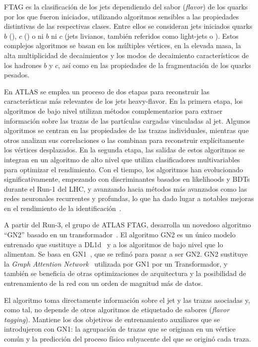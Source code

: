 \ac{FTAG} es la clasificación de los jets dependiendo del sabor (\textit{flavor}) de los quarks por los que fueron iniciados, utilizando algoritmos sensibles a las propiedades distintivas de las respectivas clases. Entre ellos se consideran jets iniciados quarks \(b\) (\bjets), \(c\) (\cjets) o ni \(b\) ni \(c\) (jets livianos, también referidos como light-jets o \ljets).
Estos complejos algoritmos se basan en los múltiples vértices, en la elevada masa, la alta multiplicidad de decaimientos y los modos de decaimiento característicos de los hadrones \(b\) y \(c\), así como en las propiedades de la fragmentación de los quarks pesados.


En \ac{ATLAS} se emplea un proceso de dos etapas para reconstruir las características más relevantes de los jets heavy-flavor. En la primera etapa, los algoritmos de bajo nivel utilizan métodos complementarios para extraer información sobre las trazas de las partículas cargadas vinculadas al jet. Algunos algoritmos se centran en las propiedades de las trazas individuales, mientras que otros analizan sus correlaciones o las combinan para reconstruir explícitamente los vértices desplazados. En la segunda etapa, las salidas de estos algoritmos se integran en un algoritmo de alto nivel que utiliza clasificadores multivariables para optimizar el rendimiento. Con el tiempo, los algoritmos han evolucionado significativamente, empezando con discriminantes basados en likelihoods y \acp{BDT} durante el Run-1 del \ac{LHC}, y avanzando hacia métodos más avanzados como las redes neuronales recurrentes y profundas, lo que ha dado lugar a notables mejoras en el rendimiento de la identificación~\cite{ATLAS-FTAG-Calibration-2012,ATLAS-FTAG-Efficiency-2012,MV2Algorithm,ATLAS-FTAG-DeepLearning}.

A partir del Run-3, el grupo de \ac{ATLAS} \ac{FTAG}, desarrolla un novedoso algoritmo \enquote{GN2} basado en un transformador~\cite{GN2Transformer}. El algoritmo GN2 es un único modelo entrenado que sustituye a DL1d~\cite{ATLAS-FTAG-DL1-Run2} y a los algoritmos de bajo nivel que lo alimentan. Se basa en GN1~\cite{ATLAS-FTAG-GN1}, que se refinó para pasar a ser GN2. GN2 sustituye la \textit{Graph Attention Network}~\cite{GANs} utilizada por GN1 por un Transformador, y también se beneficia de otras optimizaciones de arquitectura y la posibilidad de entrenamiento de la red con un orden de magnitud más de datos.

El algoritmo toma directamente información sobre el jet y las trazas asociadas y, como tal, no depende de otros algoritmos de etiquetado de sabores (\textit{flavor tagging}). Mantiene los dos objetivos de entrenamiento auxiliares que se introdujeron con GN1: la agrupación de trazas que se originan en un vértice común y la predicción del proceso físico subyacente del que se originó cada traza.

